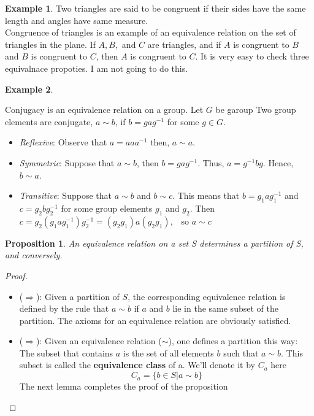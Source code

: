 \documentclass[
]{book}
\providecommand{\tightlist}{%
  \setlength{\itemsep}{0pt}\setlength{\parskip}{0pt}}
\newtheorem{proposition}{Proposition}[chapter]
\theoremstyle{definition}
\theoremstyle{definition}
\newtheorem{example}{Example}[chapter]
\theoremstyle{definition}
\theoremstyle{definition}
\theoremstyle{remark}
\begin{document}
\begin{example}
\protect\hypertarget{exm:unnamed-chunk-24}{}\label{exm:unnamed-chunk-24}Two triangles are said to be congruent if their sides have the same length and angles have same measure.\\
Congruence of triangles is an example of an equivalence relation on the set of triangles in the plane. If \(A , B,\) and \(C\) are triangles, and if \(A\) is congruent to \(B\) and \(B\) is congruent to \(C\), then \(A\) is congruent to \(C\). It is very easy to check three equivalnace propoties. I am not going to do this.
\end{example}

\begin{example}
\protect\hypertarget{exm:unnamed-chunk-25}{}\label{exm:unnamed-chunk-25}

Conjugacy is an equivalence relation on a group.
Let \(G\) be garoup Two group elements are conjugate, \(a\sim b\), if \(b = gag^{- 1}\) for some \(g\in G\).

\begin{itemize}
\tightlist
\item
  \emph{Reflexive}: Observe that \(a=aaa^{-1}\) then, \(a\sim a\).
\item
  \emph{Symmetric}: Suppose that \(a\sim b\), then \(b=gag^{-1}\). Thus,
  \(a=g^{-1}bg\). Hence, \(b \sim a\).
\item
  \emph{Transitive}: Suppose that \(a\sim b\) and \(b \sim c\). This means that \(b = g_1ag_1^{-1}\) and \(c = g_2bg_2^{-1}\) for some group elements \(g_1\) and \(g_2\).
  Then \(c = g_2(g_1ag_1^{-1})g_2^{-1} = (g_2 g_1)a (g_2 g_1),\) ~so \(a \sim c\)
\end{itemize}

\end{example}

\begin{proposition}
\protect\hypertarget{prp:unnamed-chunk-26}{}\label{prp:unnamed-chunk-26}An equivalence relation on a set S determines a partition of S, and conversely.
\end{proposition}

\begin{proof}
\leavevmode

\begin{itemize}
\tightlist
\item
  (\(\Longrightarrow\)): Given a partition of \(S\), the corresponding equivalence relation is defined by the rule
  that \(a \sim b\) if \(a\) and \(b\) lie in the same subset of the partition. The axioms for an equivalence relation are obviously satisfied.
\item
  (\(\Longrightarrow\)): Given an equivalence relation (\(\sim\)), one defines a partition this way:\\
  The subset that contains \(a\) is the set of all elements \(b\) such that \(a \sim b\). This subset is called the \textbf{equivalence class} of a. We'll denote it by \(C_a\) here
  \[C_a = \{b \in S | a\sim b\}\]
  The next lemma completes the proof of the proposition
\end{itemize}

\end{proof}
\end{document}
